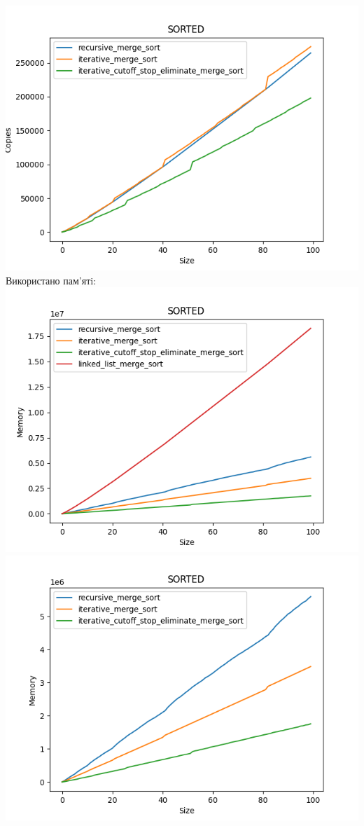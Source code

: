 \documentclass{article}
\begin{document}
            \includegraphics[scale=0.5]{sorted_Copies_3_sorts.png}
        \newline
        \indent \indent \indent Використано пам’ятi:
        \newline
            \includegraphics[scale=0.5]{sorted_Memory_4_sorts.png}
            \includegraphics[scale=0.5]{sorted_Memory_3_sorts.png}
\end{document}
